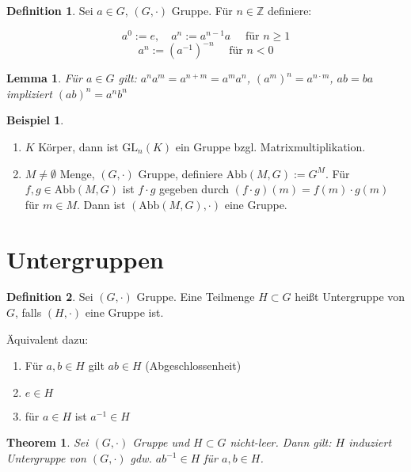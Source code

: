 \documentclass[12pt]{scrartcl}%
\newtheorem{thm}{Theorem}
\newtheorem{lemma}{Lemma}
\theoremstyle{definition}
\newtheorem*{defn}{Definition}
\newtheorem{ex}{Beispiel}
\theoremstyle{remark}
\newcommand{\gl}{\text{GL}}
\newcommand{\abb}{\text{Abb}}
\newcommand{\Inv}[1]{#1^{-1}}
\begin{document}
\begin{defn}
    Sei $a\in G$, $(G,\cdot)$ Gruppe. Für $n\in \mathbb{Z}$ definiere:
    
    $$a^0:=e, \quad a^n:=a^{n-1}a \quad \text{ für } n\geq 1$$
    $$a^n:=\left(\Inv a\right)^{-n} \quad \text{ für } n < 0$$
\end{defn}

\begin{lemma}
    Für $a\in G$ gilt: $a^n a^m=a^{n+m}=a^m a^n$, $\left(a^m \right)^n = a^{n\cdot m}$, $ab=ba$ impliziert $\left(ab \right)^n = a^n b^n$
\end{lemma}

\begin{ex}
    \begin{enumerate}
        \item $K$ Körper, dann ist $\gl_n(K)$ ein Gruppe bzgl. Matrixmultiplikation.
        \item $M\neq \emptyset$ Menge, $(G, \cdot)$ Gruppe, definiere $\abb(M,G):=G^M$. Für $f,g\in \abb(M,G)$ ist $f\cdot g$ gegeben durch $(f\cdot g)(m)=f(m)\cdot g(m)$ für $m\in M$. Dann ist $(\abb(M,G), \cdot)$ eine Gruppe.
    \end{enumerate}
\end{ex}



\section{Untergruppen}

\begin{defn}
    Sei $(G, \cdot)$ Gruppe. Eine Teilmenge $H\subset G$ heißt Untergruppe von $G$, falls $(H, \cdot)$ eine Gruppe ist.

    Äquivalent dazu:

    \begin{enumerate}[label=(\roman*)]
        \item Für $a,b\in H$ gilt $ab\in H$ (Abgeschlossenheit)
        \item $e\in H$
        \item für $a\in H$ ist $\Inv a \in H$
    \end{enumerate}
\end{defn}

\begin{thm}
    Sei $(G, \cdot)$ Gruppe und $H\subset G$ nicht-leer. Dann gilt: $H$ induziert Untergruppe von $(G, \cdot)$ gdw. $a\Inv b\in H$ für $a,b\in H$.
\end{thm}
\end{document}
